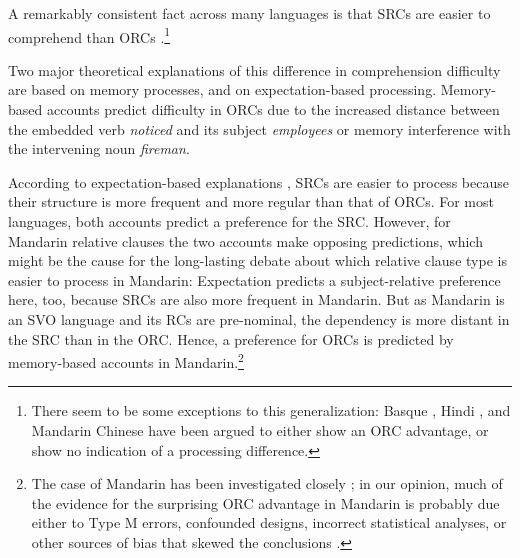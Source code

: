 \documentclass{cambridge7A}\usepackage[]{graphicx}\usepackage[]{color}
\begin{document}
A remarkably consistent fact across many languages is that SRCs are easier to comprehend than ORCs \cite[e.g.,][]{KingJust1991,GibsonDesmetGrodner2005,TraxlerMorrisSeely2002,SchriefersFriedericiKuhn1995,Frazier1987a,KwonGordonLee2010}.\footnote{There seem to be some exceptions to this generalization: Basque \citep{carreiras2010subject}, Hindi \citep{VasishthLewis2006}, and Mandarin Chinese \citep{HsiaoGibson2003} have been argued to either show an ORC advantage, or show no indication of a processing difference.}

Two major theoretical explanations of this difference in comprehension difficulty are based on memory processes, and on expectation-based processing. Memory-based accounts \citep{Gibson1998,Gibson2000,grodner,LewisVasishth2005,LewisVasishthVanDyke2006,McElreeForakerDyer2003} predict difficulty in ORCs due to the increased distance between the embedded verb \textit{noticed} and its subject \textit{employees} or memory interference with the intervening noun \textit{fireman}.
 
According to expectation-based explanations \citep{Hale2001,Levy2008,GennariMacDonald2009,MitchellCuetosCorley1995}, SRCs are easier to process because their structure is more frequent and more regular than that of ORCs. For most languages, both accounts predict a preference for the SRC. However, for Mandarin relative clauses the two accounts make opposing predictions, which might be the cause for the long-lasting debate about which relative clause type is easier to process in Mandarin: Expectation predicts a subject-relative preference here, too, because SRCs are also more frequent in Mandarin. But as Mandarin is an SVO language and its RCs are pre-nominal, the dependency is more distant in the SRC than in the ORC. Hence, a preference for ORCs is predicted by memory-based accounts in Mandarin.\footnote{The case of Mandarin has been investigated closely \citep{gibsonwu,LinBever2006,HsiaoMacDonald2013,VasishthChenLi2013,JagerChenLi2015,WuKaiserVasishth2017}; in our opinion, much of the evidence for the surprising ORC advantage in Mandarin is probably due either to Type M errors, confounded designs, incorrect statistical analyses, or other sources of bias that  skewed the conclusions \citep{Vasishth:MScStatistics}.}
\end{document}
